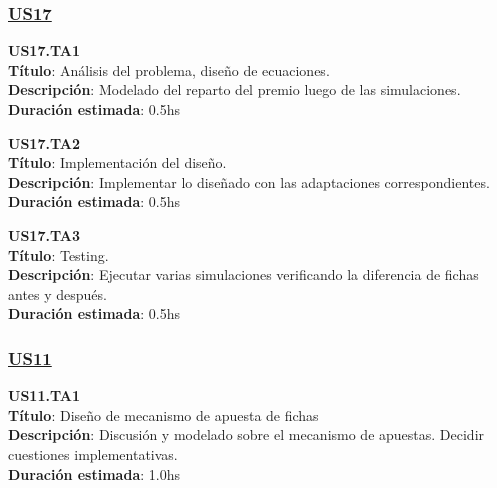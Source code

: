 \subsubsection*{\underline{US17}}

\begin{tcolorbox}
\textbf{US17.TA1} \\
\textbf{Título}: Análisis del problema, diseño de ecuaciones. \\
\textbf{Descripción}: Modelado del reparto del premio luego de las simulaciones.\\ 
\textbf{Duración estimada}: 0.5hs
\end{tcolorbox}
\vspace{10pt}

\begin{tcolorbox}
\textbf{US17.TA2} \\
\textbf{Título}: Implementación del diseño. \\
\textbf{Descripción}: Implementar lo diseñado con las adaptaciones correspondientes. \\
\textbf{Duración estimada}: 0.5hs
\end{tcolorbox}
\vspace{10pt}


\begin{tcolorbox}
\textbf{US17.TA3} \\
\textbf{Título}: Testing. \\
\textbf{Descripción}: Ejecutar varias simulaciones verificando la diferencia de fichas antes y después. \\
\textbf{Duración estimada}: 0.5hs 
\end{tcolorbox}
\vspace{10pt}


\subsubsection*{\underline{US11}}

\begin{tcolorbox}
\textbf{US11.TA1} \\
\textbf{Título}: Diseño de mecanismo de apuesta de fichas \\
\textbf{Descripción}: Discusión y modelado sobre el mecanismo de apuestas. Decidir cuestiones implementativas.\\
\textbf{Duración estimada}: 1.0hs
\end{tcolorbox}
\vspace{10pt}



